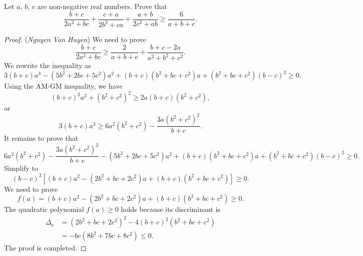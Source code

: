 \documentclass[12pt,a4paper]{book}
\begin{document}
\begin{pro}
Let $a, \, b, \, c$ are non-negative real numbers. Prove that
$$\frac{b+c}{2a^2+bc}+\frac{c+a}{2b^2+ca}+\frac{a+b}{2c^2+ab} \geq \frac{6}{a+b+c}.$$
\end{pro}

\begin{proof}
(\textit{Nguyen Van Huyen}) We need to prove
\[ \frac{b+c}{2a^2+bc} \ge \frac{2}{a+b+c}+ \frac{b+c-2a}{a^2+b^2+c^2}.\]
We rewrite the inequality as
\[3(b+c)a^3 - (5b^2+2bc+5c^2)a^2+(b+c)(b^2+bc+c^2)a+(b^2+bc+c^2)(b-c)^2 \geqslant 0.\]
Using the AM-GM inequality, we have
\[(b+c)^2a^2 + (b^2+c^2)^2 \ge 2a(b+c)(b^2+c^2),\]
or
\[3(b+c)a^3 \ge 6a^2(b^2+c^2) - \frac{3a(b^2+c^2)^2}{b+c}.\]
It remains to prove that
\[6a^2(b^2+c^2) - \frac{3a(b^2+c^2)^2}{b+c} - (5b^2+2bc+5c^2)a^2+(b+c)(b^2+bc+c^2)a+(b^2+bc+c^2)(b-c)^2 \geqslant 0.\]
Simplify to
\[(b-c)^2[(b+c)a^2-(2b^2+bc+2c^2)a+(b+c)(b^2+bc+c^2)] \ge 0.\]
We need to prove
$$f(a) = (b+c)a^2 - (2b^2+bc+2c^2)a + (b+c)(b^2+bc+c^2) \ge 0.$$
The quadratic polynomial $f(a) \ge 0$ holds because its discriminant is
\[\begin{aligned}
\Delta_a &= (2b^2+bc+2c^2)^2 - 4(b+c)^2(b^2+bc+c^2) \\
& = - bc (8b^2+7bc+8c^2) \le 0.
\end{aligned}\]
The proof is completed.
\end{proof}
\end{document}
